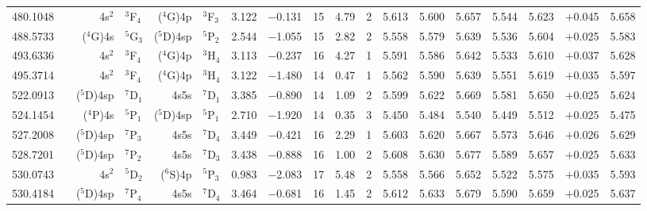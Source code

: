 \documentclass[traditabstract]{aa}
\newcommand{\pst}{\phantom{*}}
\begin{document}
\begin{center}
\begin{mpsupertabular}{r@{}c@{\ \ \ }r@{~}l@{\ }r@{~}l@{\ \ \ }c@{\ \ \ }c@{\ \ \ }c@{\ \ \ }c@{\ \ \ }c@{\ \ \ }c@{\ \ \ }c@{\ \ \ }c@{\ \ \ }c@{\ \ \ }c@{\ \ \ }r@{\ \ \ }c}
480.1048 & & \footnotesize 4s$^2$    &\footnotesize$^3$F$_4$             &\footnotesize($^4$G)4p  &\footnotesize$^3$F$_3$             & 3.122 & $-$0.131 &15  & 4.79 & 2\pst      & 5.613 & 5.600 & 5.657 & 5.544 & 5.623 & $+$0.045    & 5.658 \\
488.5733 & & \footnotesize ($^4$G)4s &\footnotesize$^5$G$_3$             &\footnotesize($^5$D)4sp &\footnotesize$^5$P$_2$             & 2.544 & $-$1.055 &15  & 2.82 & 2\pst      & 5.558 & 5.579 & 5.639 & 5.536 & 5.604 & $+$0.025    & 5.583 \\
493.6336 & & \footnotesize 4s$^2$    &\footnotesize$^3$F$_4$             &\footnotesize($^4$G)4p  &\footnotesize$^3$H$_4$             & 3.113 & $-$0.237 &16  & 4.27 & 1\pst      & 5.591 & 5.586 & 5.642 & 5.533 & 5.610 & $+$0.037    & 5.628 \\
495.3714 & & \footnotesize 4s$^2$    &\footnotesize$^3$F$_4$             &\footnotesize($^4$G)4p  &\footnotesize$^3$H$_4$             & 3.122 & $-$1.480 &14  & 0.47 & 1\pst      & 5.562 & 5.590 & 5.639 & 5.551 & 5.619 & $+$0.035    & 5.597 \\
522.0913 & & \footnotesize ($^5$D)4sp&\footnotesize$^7$D$_1$             &\footnotesize     4s5s  &\footnotesize$^7$D$_1$             & 3.385 & $-$0.890 &14  & 1.09 & 2\pst      & 5.599 & 5.622 & 5.669 & 5.581 & 5.650 & $+$0.025    & 5.624 \\
524.1454 & & \footnotesize ($^4$P)4s &\footnotesize$^5$P$_1$             &\footnotesize($^5$D)4sp &\footnotesize$^5$P$_1$             & 2.710 & $-$1.920 &14  & 0.35 & 3\pst      & 5.450 & 5.484 & 5.540 & 5.449 & 5.512 & $+$0.025    & 5.475 \\
527.2008 & & \footnotesize ($^5$D)4sp&\footnotesize$^7$P$_3$             &\footnotesize     4s5s  &\footnotesize$^7$D$_4$             & 3.449 & $-$0.421 &16  & 2.29 & 1\pst      & 5.603 & 5.620 & 5.667 & 5.573 & 5.646 & $+$0.026    & 5.629 \\
528.7201 & & \footnotesize ($^5$D)4sp&\footnotesize$^7$P$_2$             &\footnotesize     4s5s  &\footnotesize$^7$D$_3$             & 3.438 & $-$0.888 &16  & 1.00 & 2\pst      & 5.608 & 5.630 & 5.677 & 5.589 & 5.657 & $+$0.025    & 5.633 \\
530.0743 & & \footnotesize 4s$^2$    &\footnotesize$^5$D$_2$             &\footnotesize($^6$S)4p  &\footnotesize$^5$P$_3$             & 0.983 & $-$2.083 &17  & 5.48 & 2\pst      & 5.558 & 5.566 & 5.652 & 5.522 & 5.575 & $+$0.035    & 5.593 \\
530.4184 & & \footnotesize ($^5$D)4sp&\footnotesize$^7$P$_4$             &\footnotesize     4s5s  &\footnotesize$^7$D$_4$             & 3.464 & $-$0.681 &16  & 1.45 & 2\pst      & 5.612 & 5.633 & 5.679 & 5.590 & 5.659 & $+$0.025    & 5.637 \\

\end{mpsupertabular}
\end{center}
\end{document}
